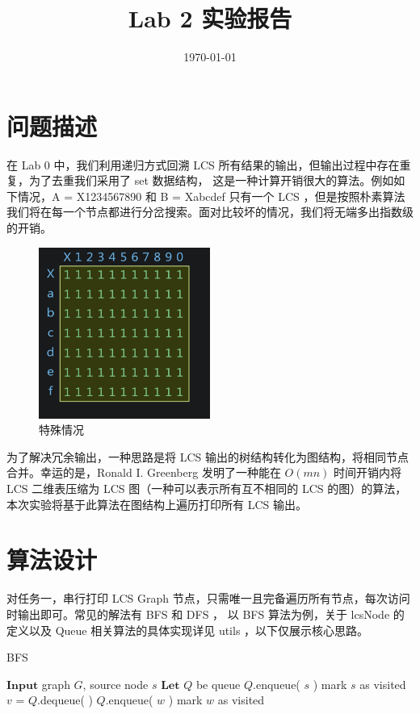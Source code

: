 \documentclass[11pt]{article}
\begin{document}
\title{\bf Lab 2 实验报告}

\author{}
\date{\today}
\maketitle


\section{问题描述}

在 Lab 0 中，我们利用递归方式回溯 LCS 所有结果的输出，但输出过程中存在重复，为了去重我们采用了 set 数据结构，
这是一种计算开销很大的算法。例如如下情况，A = X1234567890 和 B = Xabcdef 只有一个 LCS ，但是按照朴素算法
我们将在每一个节点都进行分岔搜索。面对比较坏的情况，我们将无端多出指数级的开销。

\begin{figure}[H]
	\centering
	\includegraphics[width=0.5\textwidth]{./img/example.jpg}
	\caption{特殊情况}
\end{figure}

为了解决冗余输出，一种思路是将 LCS 输出的树结构转化为图结构，将相同节点合并。幸运的是，Ronald I. Greenberg
发明了一种能在 $ O(mn) $ 时间开销内将 LCS 二维表压缩为 LCS 图（一种可以表示所有互不相同的 LCS 的图）的算法，
本次实验将基于此算法在图结构上遍历打印所有 LCS 输出。


\section{算法设计}

对任务一，串行打印 LCS Graph 节点，只需唯一且完备遍历所有节点，每次访问时输出即可。常见的解法有 BFS 和 DFS ，
以 BFS 算法为例，关于 lcsNode 的定义以及 Queue 相关算法的具体实现详见 utils ，以下仅展示核心思路。

\begin{algorithm}[H]
	\caption{BFS}
	\begin{algorithmic}
		\State $\textbf{Input}$ graph $G$, source node $s$
		\State $\textbf{Let}$ $Q$ be queue
		\State $Q$.enqueue( $s$ )
		\State mark $s$ as visited
		\State $v$  =  $Q$.dequeue( )
		\State $Q$.enqueue( $w$ )
		\State mark $w$ as visited
		\EndIf
		\EndFor
		\EndWhile
	\end{algorithmic}
\end{algorithm}
\end{document}
